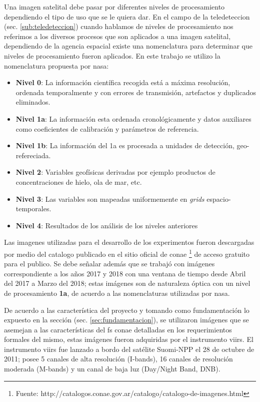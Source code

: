 Una imagen satelital debe pasar por diferentes niveles de procesamiento dependiendo el tipo de uso que se le quiera dar. En el campo de la teledeteccion (sec. \ref{sub:teledeteccion}) cuando hablamos de niveles de procesamiento nos referimos a los diversos procesos que son aplicados a una imagen satelital, dependiendo de la agencia espacial existe una nomenclatura para determinar que niveles de procesamiento fueron aplicados. En este trabajo se utilizo la nomenclatura propuesta por \ac{nasa}:
\begin{itemize}
	\item \textbf{Nivel 0}: La información científica recogida está a máxima resolución, ordenada temporalmente y con errores de transmisión, artefactos y duplicados eliminados.
 	\item \textbf{Nivel 1a}: La información esta ordenada cronológicamente y datos auxiliares como coeficientes de calibración y parámetros de referencia.
 	\item \textbf{Nivel 1b}: La información del 1a es procesada a unidades de detección, geo-refereciada.
 	\item \textbf{Nivel 2}: Variables geofísicas derivadas por ejemplo productos de concentraciones de hielo, ola de mar, etc.
 	\item \textbf{Nivel 3}: Las variables son mapeadas uniformemente en \textit{grids} espacio-temporales.
 	\item \textbf{Nivel 4}: Resultados de los análisis de los niveles anteriores
\end{itemize}

Las imagenes utilizadas para el desarrollo de los experimentos fueron descargadas por medio del catalogo  publicado en el sitio oficial de \ac{conae} \footnote{Fuente: http://catalogos.conae.gov.ar/catalogo/catalogo-de-imagenes.html} de acceso gratuito para el publico. Se debe señalar además que se trabajó con imágenes correspondiente a los años 2017 y 2018 con una ventana de tiempo desde Abril del 2017 a Marzo del 2018; estas imágenes son de naturaleza óptica con un nivel de procesamiento \textbf{1a}, de acuerdo a las nomenclaturas utilizadas por \ac{nasa}.

De acuerdo a las característica del proyecto y tomando como fundamentación lo expuesto en la sección (sec. \ref{sec:fundamentacion}), se utilizaron imágenes que se asemejan a las características del \ac{fs} \ac{conae} detalladas en los requerimientos formales del mismo, estas imágenes fueron adquiridas por el instrumento \ac{viirs}. El instrumento \ac{viirs} fue lanzado a bordo del satélite Suomi-NPP el 28 de octubre de 2011; posee 5 canales de alta resolución (I-bands), 16 canales de resolución moderada (M-bands) y un canal de baja luz (Day/Night Band, DNB).  

